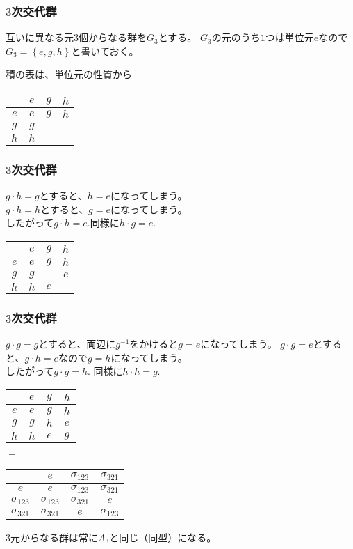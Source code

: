 \documentclass[12pt, t]{beamer}
\newcommand{\clr}[1]{\left\{{}#1\right\}{}}
\begin{document}
\begin{frame}
\frametitle{$3$次交代群}
互いに異なる元$3$個からなる群を$G_3$とする。
$G_3$の元のうち$1$つは単位元$e$なので$G_3 = \clr{e, g, h}$と書いておく。

積の表は、単位元の性質から
\begin{center}
\begin{tabular}{c|ccc}
      &$e$&$g$&$h$\\ \hline
  $e$ &$e$&$g$&$h$\\
  $g$ &$g$&   & \\
  $h$ &$h$&   &
\end{tabular}
\end{center}
\end{frame}

\begin{frame}
\frametitle{$3$次交代群}
$g \cdot h = g$とすると、$h = e$になってしまう。\\
$g \cdot h = h$とすると、$g = e$になってしまう。\\
したがって$g \cdot h = e$.同様に$h \cdot g = e$.
\begin{center}
\begin{tabular}{c|ccc}
      &$e$&$g$&$h$\\ \hline
  $e$ &$e$&$g$&$h$\\
  $g$ &$g$&   &$e$\\
  $h$ &$h$&$e$&
\end{tabular}
\end{center}
\end{frame}

\begin{frame}
\frametitle{$3$次交代群}
$g \cdot g = g$とすると、両辺に$g^{-1}$をかけると$g = e$になってしまう。
$g \cdot g = e$とすると、$g \cdot h = e$なので$g = h$になってしまう。\\
したがって$g \cdot g = h$.
同様に$h \cdot h = g$.
\begin{center}
\begin{tabular}{c|ccc}
      &$e$&$g$&$h$\\ \hline
  $e$ &$e$&$g$&$h$\\
  $g$ &$g$&$h$&$e$\\
  $h$ &$h$&$e$&$g$
\end{tabular}
$=$
\begin{tabular}{c|ccc}
                 &$e$           &$\sigma_{123}$&$\sigma_{321}$\\ \hline
  $e$            &$e$           &$\sigma_{123}$&$\sigma_{321}$\\
  $\sigma_{123}$ &$\sigma_{123}$&$\sigma_{321}$&$e$ \\
  $\sigma_{321}$ &$\sigma_{321}$&$e$           &$\sigma_{123}$
\end{tabular}
\end{center}
$3$元からなる群は常に$A_3$と同じ（同型）になる。
\end{frame}
\end{document}
